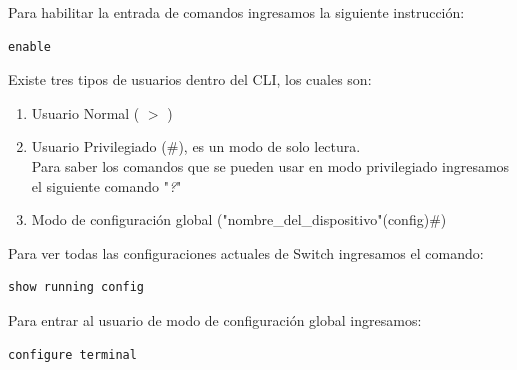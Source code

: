 \documentclass[journal]{IEEEtran}
\begin{document}
Para habilitar la entrada de comandos ingresamos la siguiente instrucción:
\begin{lstlisting}[frame=single]
enable	
\end{lstlisting}

Existe tres tipos de usuarios dentro del CLI, los cuales son:
\begin{enumerate}
	\item Usuario Normal ( $>$ )
	\item Usuario Privilegiado ($\#$), es un modo de solo lectura. \\
	Para saber los comandos que se pueden usar en modo privilegiado ingresamos el siguiente comando "\textit{?}"
	\item Modo de configuración global ("nombre\_del\_dispositivo"(config)$\#$)
\end{enumerate}

\newpage

Para ver todas las configuraciones actuales de Switch ingresamos el comando:
\begin{lstlisting}[frame=single]
	show running config
\end{lstlisting}

Para entrar al usuario de modo de configuración global ingresamos:
\begin{lstlisting}[frame=single]
	configure terminal
\end{lstlisting}
\end{document}
